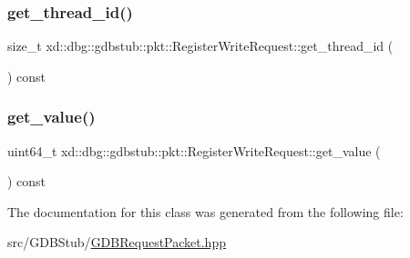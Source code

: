 \subsubsection{\texorpdfstring{get\+\_\+thread\+\_\+id()}{get\_thread\_id()}}
{\footnotesize\ttfamily size\+\_\+t xd\+::dbg\+::gdbstub\+::pkt\+::\+Register\+Write\+Request\+::get\+\_\+thread\+\_\+id (\begin{DoxyParamCaption}{ }\end{DoxyParamCaption}) const\hspace{0.3cm}{\ttfamily [inline]}}

\mbox{\label{classxd_1_1dbg_1_1gdbstub_1_1pkt_1_1_register_write_request_ad57b08c5a4b6006fd447261453d72135}} 
\subsubsection{\texorpdfstring{get\+\_\+value()}{get\_value()}}
{\footnotesize\ttfamily uint64\+\_\+t xd\+::dbg\+::gdbstub\+::pkt\+::\+Register\+Write\+Request\+::get\+\_\+value (\begin{DoxyParamCaption}{ }\end{DoxyParamCaption}) const\hspace{0.3cm}{\ttfamily [inline]}}



The documentation for this class was generated from the following file\+:\begin{DoxyCompactItemize}
\item 
src/\+G\+D\+B\+Stub/\mbox{\hyperlink{_g_d_b_request_packet_8hpp}{G\+D\+B\+Request\+Packet.\+hpp}}\end{DoxyCompactItemize}
